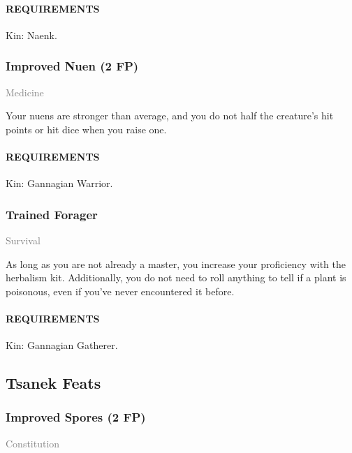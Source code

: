     \paragraph{REQUIREMENTS} Kin: Naenk.

    \subsubsection{Improved Nuen (2 FP)} \label{feat::improvednuen}
    \small{\textcolor{gray}{Medicine}}

    \normalsize
    Your nuens are stronger than average, and you do not half the creature's hit points or hit dice when you raise one.

    \paragraph{REQUIREMENTS} Kin: Gannagian Warrior.

    \subsubsection{Trained Forager} \label{feat::trainedforager}
    \small{\textcolor{gray}{Survival}}

    \normalsize
    As long as you are not already a master, you increase your proficiency with the herbalism kit.
    Additionally, you do not need to roll anything to tell if a plant is poisonous, even if you've never encountered it before.
    \paragraph{REQUIREMENTS} Kin: Gannagian Gatherer.

\subsection*{Tsanek Feats}
    \subsubsection{Improved Spores (2 FP)} \label{feat::improvedspores}
    \small{\textcolor{gray}{Constitution}}


